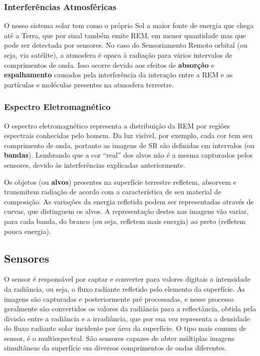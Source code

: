 \subsubsection{Interferências
Atmosféricas}\label{interferencias-atmosfericas}

O nosso sistema solar tem como o próprio Sol a maior fonte de energia
que chega até a Terra, que por sinal também emite \acs{REM}, em menor
quantidade mas que pode ser detectada por sensores. No caso do Sensoriamento Remoto
orbital (ou seja, via satélite), a atmosfera é opaca à radiação para
vários intervalos de comprimentos de onda. Isso ocorre devido aos
efeitos de \textbf{absorção} e \textbf{espalhamento} causados pela
interferência da interação entre a \acs{REM} e as partículas e moléculas
presentes na atmosfera terrestre. \cite{meneses2012introduccao}

\subsubsection{Espectro
Eletromagnético}\label{espectro-eletromagnetico}

O espectro eletromagnético representa a distribuição da \acs{REM} por
regiões espectrais conhecidas pelo homem. Da luz visível, por exemplo,
cada cor tem seu comprimento de onda, portanto as imagens de SR são
definidas em intervalos (ou \textbf{bandas}). Lembrando que a cor
``real'' dos alvos não é a mesma capturados pelos sensores, devido às
interferências explicadas anteriormente. \cite{meneses2012introduccao}

Os objetos (ou \textbf{alvos}) presentes na superfície terrestre
refletem, absorvem e transmitem radiação de acordo com a característica
de seu material de composição. As variações da energia refletida podem
ser representadas através de curvas, que distinguem os alvos. A
representação destes nas imagens vão variar, para cada banda, do branco
(ou seja, refletem mais energia) ao preto (refletem pouca energia).

\subsection{Sensores}\label{sensores}

O sensor é responsável por captar e converter para valores digitais a
intensidade da radiância, ou seja, o fluxo radiante refletido pelo
elemento da superfície. As imagens são capturadas e posteriormente pré
processadas, e nesse processo geralmente são convertidos os valores da
radiância para a reflectância, obtida pela divisão entre a radiância e a
irradiância, que por sua vez representa a densidade do fluxo radiante
solar incidente por área da superfície. O tipo mais comum de sensor, é o
multiespectral. São sensores capazes de obter múltiplas imagens
simultâneas da superfície em diversos comprimentos de ondas diferentes. \cite{meneses2012introduccao}

